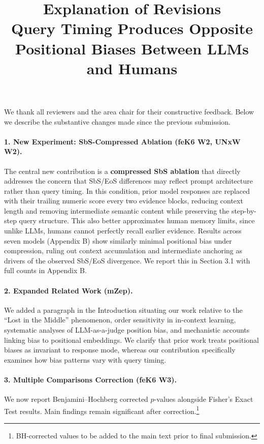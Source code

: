\documentclass[11pt, letterpaper]{article}
\title{\textbf{Explanation of Revisions}\\
\large Query Timing Produces Opposite Positional Biases Between LLMs and Humans}
\author{}
\date{}
\begin{document}
\maketitle
\thispagestyle{empty}

We thank all reviewers and the area chair for their constructive feedback. Below we describe the substantive changes made since the previous submission.

\paragraph{1. New Experiment: SbS-Compressed Ablation (feK6 W2, UNxW W2).}
The central new contribution is a \textbf{compressed SbS ablation} that directly addresses the concern that SbS/EoS differences may reflect prompt architecture rather than query timing. In this condition, prior model responses are replaced with their trailing numeric score every two evidence blocks, reducing context length and removing intermediate semantic content while preserving the step-by-step query structure. This also better approximates human memory limits, since unlike LLMs, humans cannot perfectly recall earlier evidence. Results across seven models (Appendix B) show similarly minimal positional bias under compression, ruling out context accumulation and intermediate anchoring as drivers of the observed SbS/EoS divergence. We report this in Section 3.1 with full counts in Appendix B.

\paragraph{2. Expanded Related Work (mZep).}
We added a paragraph in the Introduction situating our work relative to the ``Lost in the Middle'' phenomenon, order sensitivity in in-context learning, systematic analyses of LLM-as-a-judge position bias, and mechanistic accounts linking bias to positional embeddings. We clarify that prior work treats positional biases as invariant to response mode, whereas our contribution specifically examines how bias patterns vary with query timing.

\paragraph{3. Multiple Comparisons Correction (feK6 W3).}
We now report Benjamini--Hochberg corrected $p$-values alongside Fisher's Exact Test results. Main findings remain significant after correction.\footnote{BH-corrected values to be added to the main text prior to final submission.}
\end{document}
